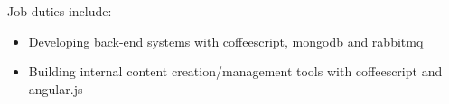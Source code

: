 \normalsize
Job duties include:
\small
\begin{itemize}
    \item Developing back-end systems with coffeescript, mongodb and rabbitmq
    \item Building internal content creation/management tools with coffeescript and angular.js
\end{itemize}
\normalsize
\medskip
